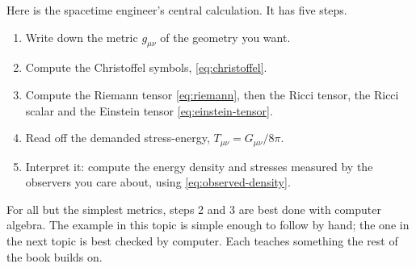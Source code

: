 Here is the spacetime engineer's central calculation. It has five steps.
\begin{enumerate}
\item Write down the metric $g_{\mu\nu}$ of the geometry you want.
\item Compute the Christoffel symbols, \cref{eq:christoffel}.
\item Compute the Riemann tensor \cref{eq:riemann}, then the Ricci tensor, the
  Ricci scalar and the Einstein tensor \cref{eq:einstein-tensor}.
\item Read off the demanded stress-energy, $T_{\mu\nu} = G_{\mu\nu}/8\pi$.
\item Interpret it: compute the energy density and stresses measured by the
  observers you care about, using \cref{eq:observed-density}.
\end{enumerate}
For all but the simplest metrics, steps 2 and 3 are best done with computer
algebra. The example in this topic is simple enough to follow by hand; the one
in the next topic is best checked by computer. Each teaches something the rest
of the book builds on.

